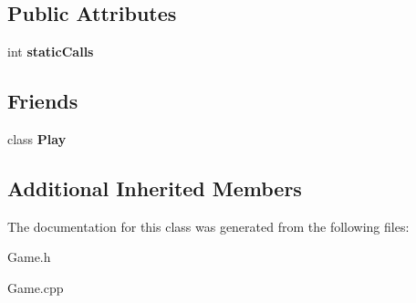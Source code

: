 \subsection*{Public Attributes}
\begin{DoxyCompactItemize}
\item 
\hypertarget{class_game_ac3bca0716ae3681b13214b1fcd57784b}{}\label{class_game_ac3bca0716ae3681b13214b1fcd57784b} 
int {\bfseries static\+Calls}
\end{DoxyCompactItemize}
\subsection*{Friends}
\begin{DoxyCompactItemize}
\item 
\hypertarget{class_game_a7c2f46121e704a36ac14bdfdaced4e04}{}\label{class_game_a7c2f46121e704a36ac14bdfdaced4e04} 
class {\bfseries Play}
\end{DoxyCompactItemize}
\subsection*{Additional Inherited Members}


The documentation for this class was generated from the following files\+:\begin{DoxyCompactItemize}
\item 
Game.\+h\item 
Game.\+cpp\end{DoxyCompactItemize}
